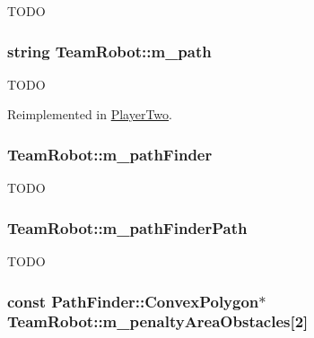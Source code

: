 \label{classTeamRobot_acf38fcc5b3c4ab4815fb151e39d5889c}
TODO \hypertarget{classTeamRobot_af170b8d2e1b76b12f8cc83f6ec908e40}{
\subsubsection[{m\_\-path}]{\setlength{\rightskip}{0pt plus 5cm}string {\bf TeamRobot::m\_\-path}}}
\label{classTeamRobot_af170b8d2e1b76b12f8cc83f6ec908e40}
TODO 

Reimplemented in \hyperlink{classPlayerTwo_af9880885ced53351b52dcc949f6df162}{PlayerTwo}.

\hypertarget{classTeamRobot_ac5845718f0d540e3f17f39d62d6f11c7}{
\subsubsection[{m\_\-pathFinder}]{ {\bf TeamRobot::m\_\-pathFinder}}}
\label{classTeamRobot_ac5845718f0d540e3f17f39d62d6f11c7}
TODO \hypertarget{classTeamRobot_aca22e17bd02f1ce84786ed2194764afa}{
\subsubsection[{m\_\-pathFinderPath}]{ {\bf TeamRobot::m\_\-pathFinderPath}}}
\label{classTeamRobot_aca22e17bd02f1ce84786ed2194764afa}
TODO \hypertarget{classTeamRobot_a155fbee5f74459799332801b09c99616}{
\subsubsection[{m\_\-penaltyAreaObstacles}]{\setlength{\rightskip}{0pt plus 5cm}const {\bf PathFinder::ConvexPolygon}$\ast$ {\bf TeamRobot::m\_\-penaltyAreaObstacles}\mbox{[}2\mbox{]}}}
